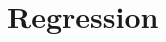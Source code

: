\documentclass[ppgc,diss,english]{iiufrgs}
\newtheorem{definition}{Definition}
\begin{document}






\section{Regression}
\label{background-regression}
\end{document}
